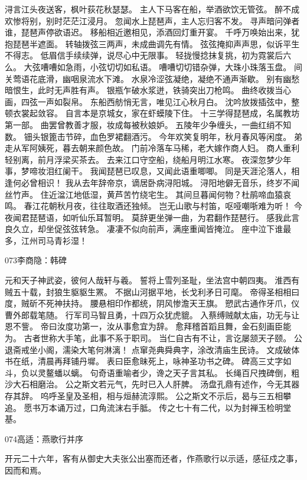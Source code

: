 浔言江头夜送客，枫叶荻花秋瑟瑟。
主人下马客在船，举酒欲饮无管弦。
醉不成欢惨将别，别时茫茫江浸月。
忽闻水上琵琶声，主人忘归客不发。
寻声暗问弹者谁，琵琶声停欲语迟。
移船相近邀相见，添酒回灯重开宴。
千呼万唤始出来，犹抱琵琶半遮面。
转轴拨弦三两声，未成曲调先有情。
弦弦掩抑声声思，似诉平生不得志。
低眉信手续续弹，说尽心中无限事。
轻拢慢捻抹复挑，初为霓裳后六么。
大弦嘈嘈如急雨，小弦切切如私语。
嘈嘈切切错杂弹，大珠小珠落玉盘。
间关莺语花底滑，幽咽泉流水下滩。
水泉冷涩弦凝绝，凝绝不通声渐歇。
别有幽愁暗恨生，此时无声胜有声。
银瓶乍破水浆迸，铁骑突出刀枪鸣。
曲终收拨当心画，四弦一声如裂帛。
东船西舫悄无言，唯见江心秋月白。
沈吟放拨插弦中，整顿衣裳起敛容。
自言本是京城女，家在虾蟆陵下住。
十三学得琵琶成，名属教坊第一部。
曲罢曾教善才服，妆成每被秋娘妒。
五陵年少争缠头，一曲红绡不知数。
钿头银篦击节碎，血色罗裙翻酒污。
今年欢笑复明年，秋月春风等闲度。
弟走从军阿姨死，暮去朝来颜色故。
门前冷落车马稀，老大嫁作商人妇。
商人重利轻别离，前月浮梁买茶去。
去来江口守空船，绕船月明江水寒。
夜深忽梦少年事，梦啼妆泪红阑干。
我闻琵琶已叹息，又闻此语重唧唧。
同是天涯沦落人，相逢何必曾相识！
我从去年辞帝京，谪居卧病浔阳城。
浔阳地僻无音乐，终岁不闻丝竹声。
住近湓江地低湿，黄芦苦竹绕宅生。
其间旦暮闻何物？杜鹃啼血猿哀鸣。
春江花朝秋月夜，往往取酒还独倾。
岂无山歌与村笛，呕哑嘲哳难为听！
今夜闻君琵琶语，如听仙乐耳暂明。
莫辞更坐弹一曲，为君翻作琵琶行。
感我此言良久立，却坐促弦弦转急。
凄凄不似向前声，满座重闻皆掩泣。
座中泣下谁最多，江州司马青衫湿！

073李商隐：韩碑

元和天子神武姿，彼何人哉轩与羲。
誓将上雪列圣耻，坐法宫中朝四夷。
淮西有贼五十载，封狼生䝙䝙生罴。
不据山河据平地，长戈利矛日可麾。
帝得圣相相曰度，贼斫不死神扶持。
腰悬相印作都统，阴风惨澹天王旗。
愬武古通作牙爪，仪曹外郎载笔随。
行军司马智且勇，十四万众犹虎貔。
入蔡缚贼献太庙，功无与让恩不訾。
帝曰汝度功第一，汝从事愈宜为辞。
愈拜稽首蹈且舞，金石刻画臣能为。
古者世称大手笔，此事不系于职司。
当仁自古有不让，言讫屡颔天子颐。
公退斋戒坐小阁，濡染大笔何淋漓！
点窜尧典舜典字，涂改清庙生民诗。
文成破体书在纸，清晨再拜铺丹墀。
表曰臣愈昧死上，咏神圣功书之碑。
碑高三丈字如斗，负以灵鳌蟠以螭。
句奇语重喻者少，谗之天子言其私。
长绳百尺拽碑倒，粗沙大石相磨治。
公之斯文若元气，先时已入人肝脾。
汤盘孔鼎有述作，今无其器存其辞。
呜呼圣皇及圣相，相与烜赫流淳熙。
公之斯文不示后，曷与三五相攀追。
愿书万本诵万过，口角流沫右手胝。
传之七十有二代，以为封禅玉检明堂基。

074高适：燕歌行并序

开元二十六年，客有从御史大夫张公出塞而还者，作燕歌行以示适，感征戍之事，
因而和焉。

